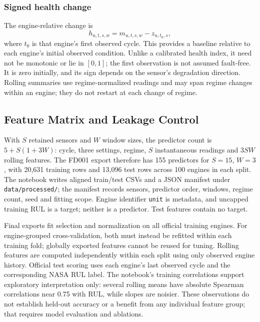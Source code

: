 \subsubsection{Signed health change}
The engine-relative change is
\begin{equation}
    h_{u,t,s,w}=m_{u,t,s,w}-z_{u,t_0,s},
\end{equation}
where $t_0$ is that engine's first observed cycle. This provides a baseline
relative to each engine's initial observed condition. Unlike a calibrated
health index, it need not be monotonic or lie in $[0,1]$; the first observation
is not assumed fault-free. It is zero initially, and its sign depends on the
sensor's degradation direction. Rolling summaries use regime-normalized
readings and may span regime changes within an engine; they do not restart at
each change of regime.

\subsection{Feature Matrix and Leakage Control}
With $S$ retained sensors and $W$ window sizes, the predictor count is
$5+S(1+3W)$: cycle, three settings, regime, $S$ instantaneous readings and
$3SW$ rolling features. The FD001 export therefore has 155 predictors for
$S=15$, $W=3$, with 20,631 training rows and 13,096 test rows across 100 engines
in each split. The notebook writes aligned train/test CSVs and a JSON manifest
under \texttt{data/processed/}; the manifest records sensors, predictor order,
windows, regime count, seed and fitting scope. Engine identifier
\texttt{unit} is metadata, and uncapped training RUL is a target; neither is a
predictor. Test features contain no target.

Final exports fit selection and normalization on all official training engines.
For engine-grouped cross-validation, both must instead be refitted within each
training fold; globally exported features cannot be reused for tuning. Rolling
features are computed independently within each split using only observed
engine history. Official test scoring uses each engine's last observed cycle
and the corresponding NASA RUL label. The notebook's training correlations
support exploratory interpretation only: several rolling means have absolute
Spearman correlations near 0.75 with RUL, while slopes are noisier. These
observations do not establish held-out accuracy or a benefit from any individual
feature group; that requires model evaluation and ablations.
